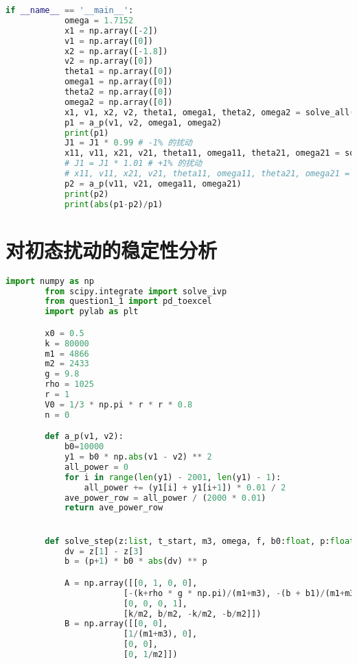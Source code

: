\documentclass[withoutpreface,bwprint]{cumcmthesis} %
\begin{document}
\begin{appendices}
\begin{lstlisting}[language=python]
        if __name__ == '__main__':
            omega = 1.7152
            x1 = np.array([-2])
            v1 = np.array([0])
            x2 = np.array([-1.8])
            v2 = np.array([0])
            theta1 = np.array([0])
            omega1 = np.array([0])
            theta2 = np.array([0])
            omega2 = np.array([0])
            x1, v1, x2, v2, theta1, omega1, theta2, omega2 = solve_all(x1, v1, x2, v2, theta1, omega1, theta2, omega2, m3=1028.876, J3=7001.914, omega=1.7152, f=3640, L=1690, b1=683.4558, B1=654.3383 * 2, b0=10000, B0=1000)
            p1 = a_p(v1, v2, omega1, omega2)
            print(p1)
            J1 = J1 * 0.99 # -1% 的扰动
            x11, v11, x21, v21, theta11, omega11, theta21, omega21 = solve_all(x1, v1, x2, v2, theta1, omega1, theta2, omega2, m3=1028.876, J3=7001.914, omega=1.7152, f=3640, L=1690, b1=683.4558, B1=654.3383 * 2, b0=10000, B0=1000)
            # J1 = J1 * 1.01 # +1% 的扰动
            # x11, v11, x21, v21, theta11, omega11, theta21, omega21 = solve_all(x1, v1, x2, v2, theta1, omega1, theta2, omega2, m3=1028.876, J3=7001.914, omega=1.7152, f=3640, L=1690, b1=683.4558, B1=654.3383 * 2, b0=10000, B0=1000)
            p2 = a_p(v11, v21, omega11, omega21)
            print(p2)
            print(abs(p1-p2)/p1)
        \end{lstlisting}
        \section{对初态扰动的稳定性分析}
        \begin{lstlisting}[language=python]
        import numpy as np
        from scipy.integrate import solve_ivp
        from question1_1 import pd_toexcel
        import pylab as plt

        x0 = 0.5
        k = 80000
        m1 = 4866
        m2 = 2433
        g = 9.8
        rho = 1025
        r = 1
        V0 = 1/3 * np.pi * r * r * 0.8 
        n = 0

        def a_p(v1, v2):
            b0=10000
            y1 = b0 * np.abs(v1 - v2) ** 2
            all_power = 0
            for i in range(len(y1) - 2001, len(y1) - 1):
                all_power += (y1[i] + y1[i+1]) * 0.01 / 2
            ave_power_row = all_power / (2000 * 0.01)
            return ave_power_row


        def solve_step(z:list, t_start, m3, omega, f, b0:float, p:float, b1:float)->list:
            dv = z[1] - z[3]
            b = (p+1) * b0 * abs(dv) ** p

            A = np.array([[0, 1, 0, 0], 
                        [-(k+rho * g * np.pi)/(m1+m3), -(b + b1)/(m1+m3), k/(m1+m3), b/(m1+m3)], 
                        [0, 0, 0, 1], 
                        [k/m2, b/m2, -k/m2, -b/m2]])
            B = np.array([[0, 0], 
                        [1/(m1+m3), 0], 
                        [0, 0], 
                        [0, 1/m2]])


\end{lstlisting}
\end{appendices}
\end{document}
